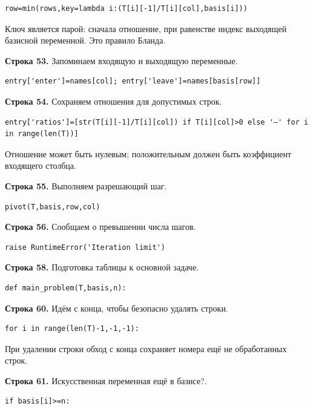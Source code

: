 \documentclass[12pt,a4paper]{article}
\begin{document}
\begin{Verbatim}[fontsize=\small,breaklines=true,breakanywhere=true]
        row=min(rows,key=lambda i:(T[i][-1]/T[i][col],basis[i]))
\end{Verbatim}
Ключ является парой: сначала отношение, при равенстве индекс выходящей базисной переменной. Это правило Бланда.
\par\textbf{Строка 53.} Запоминаем входящую и выходящую переменные.
\begin{Verbatim}[fontsize=\small,breaklines=true,breakanywhere=true]
        entry['enter']=names[col]; entry['leave']=names[basis[row]]
\end{Verbatim}
\par\textbf{Строка 54.} Сохраняем отношения для допустимых строк.
\begin{Verbatim}[fontsize=\small,breaklines=true,breakanywhere=true]
        entry['ratios']=[str(T[i][-1]/T[i][col]) if T[i][col]>0 else '—' for i in range(len(T))]
\end{Verbatim}
Отношение может быть нулевым; положительным должен быть коэффициент входящего столбца.
\par\textbf{Строка 55.} Выполняем разрешающий шаг.
\begin{Verbatim}[fontsize=\small,breaklines=true,breakanywhere=true]
        pivot(T,basis,row,col)
\end{Verbatim}
\par\textbf{Строка 56.} Сообщаем о превышении числа шагов.
\begin{Verbatim}[fontsize=\small,breaklines=true,breakanywhere=true]
    raise RuntimeError('Iteration limit')
\end{Verbatim}
\par\textbf{Строка 58.} Подготовка таблицы к основной задаче.
\begin{Verbatim}[fontsize=\small,breaklines=true,breakanywhere=true]
def main_problem(T,basis,n):
\end{Verbatim}
\par\textbf{Строка 60.} Идём с конца, чтобы безопасно удалять строки.
\begin{Verbatim}[fontsize=\small,breaklines=true,breakanywhere=true]
    for i in range(len(T)-1,-1,-1):
\end{Verbatim}
При удалении строки обход с конца сохраняет номера ещё не обработанных строк.
\par\textbf{Строка 61.} Искусственная переменная ещё в базисе?.
\begin{Verbatim}[fontsize=\small,breaklines=true,breakanywhere=true]
        if basis[i]>=n:
\end{Verbatim}
\end{document}
